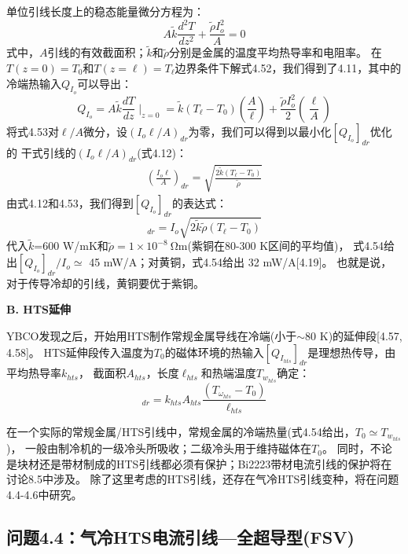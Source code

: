 单位引线长度上的稳态能量微分方程为：
\begin{equation}%
A\tilde{k}\frac{d^2T}{dz^2}+\frac{\tilde{\rho}I_{o}^{2}}{A}=0
\end{equation}
式中，$A$引线的有效截面积；$\tilde{k}$和$\tilde{\rho}$分别是金属的温度平均热导率和电阻率。
在$T(z = 0) = T_0$和$T(z =\ell) = T_\ell$边界条件下解式4.52，我们得到了4.11，其中的冷端热输入$Q_{I_o}$可以导出：
\begin{equation}%
Q_{I_o}=A\tilde{k}\frac{dT}{dz}\mid_{z=0}=\tilde{k}(T_\ell-T_0)\left(\frac{A}{\ell}\right)+\frac{\tilde{\rho}I_{o}^{2}}{2}\left(\frac{\ell}{A}\right)
\end{equation}
将式4.53对$\ell/A$微分，设$(I_o\ell/A)_{dr}$为零，我们可以得到以最小化$[Q_{I_o}]_{dr}$优化的
干式引线的$(I_o\ell/A)_{dr}$(式4.12)：
\begin{align*}%
\left(\frac{I_o\ell}{A}\right)_{dr}=\sqrt{\frac{2\tilde{k}(T_\ell-T_0)}{\tilde{\rho}}}\tag{4.12}
\end{align*}
由式4.12和4.53，我们得到$[Q_{I_o}]_{dr}$的表达式：
\begin{equation}%
[Q_{I_o}]_{dr}=I_o\sqrt{2\tilde{k}\tilde{\rho}(T_\ell-T_0)}
\end{equation}
代入$\tilde{k}$=600 W/mK和$\tilde{\rho}=1\times 10^{-8}\ \mathrm{\Omega m}$(紫铜在80-300 K区间的平均值)，
式4.54给出$[Q_{I_o}]_{dr}/I_o\simeq$ 45 mW/A；对黄铜，式4.54给出 32 mW/A[4.19]。
也就是说，对于传导冷却的引线，黄铜要优于紫铜。

\textbf{B. HTS延伸}

YBCO发现之后，开始用HTS制作常规金属导线在冷端(小于$\sim$80 K)的延伸段[4.57, 4.58]。
HTS延伸段传入温度为$T_0$的磁体环境的热输入$[Q_{I_{hts}}]_{dr}$是理想热传导，由平均热导率$k_{hts}$，
截面积$A_{hts}$，长度$\ell_{hts}$和热端温度$T_{w_{hts}}$确定：
\begin{equation}%
[Q_{I_hts}]_{dr}=k_{hts}A_{hts}\frac{(T_{\omega_{hts}}-T_0)}{\ell_{hts}}
\end{equation}

在一个实际的常规金属/HTS引线中，常规金属的冷端热量(式4.54给出，$T_0\simeq T_{w_{hts}}$)，
一般由制冷机的一级冷头所吸收；二级冷头用于维持磁体在$T_0$。
同时，不论是块材还是带材制成的HTS引线都必须有保护；Bi2223带材电流引线的保护将在讨论8.5中涉及。
除了这里考虑的HTS引线，还存在气冷HTS引线变种，将在问题4.4-4.6中研究。


\subsection{问题4.4：气冷HTS电流引线---全超导型(FSV)}

